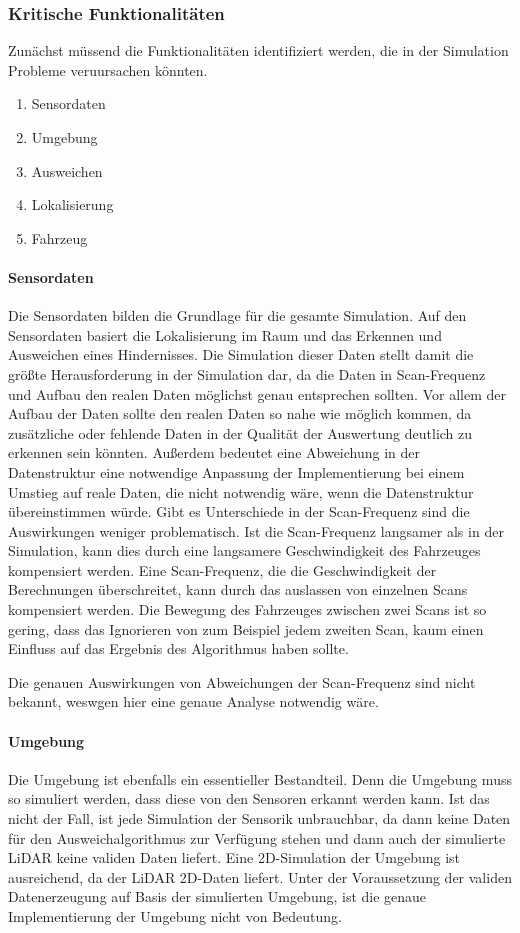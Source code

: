 \subsubsection{Kritische Funktionalitäten}
Zunächst müssend die Funktionalitäten identifiziert werden, die in der Simulation Probleme veruursachen könnten.
\begin{enumerate}
    \item Sensordaten
    \item Umgebung 
    \item Ausweichen
    \item Lokalisierung
    \item Fahrzeug
\end{enumerate}

\paragraph{Sensordaten}
Die Sensordaten bilden die Grundlage für die gesamte Simulation. 
Auf den Sensordaten basiert die Lokalisierung im Raum und das Erkennen und Ausweichen eines Hindernisses. 
Die Simulation dieser Daten stellt damit die größte Herausforderung in der Simulation dar, 
da die Daten in Scan-Frequenz und Aufbau den realen Daten möglichst genau entsprechen sollten.
Vor allem der Aufbau der Daten sollte den realen Daten so nahe wie möglich kommen, 
da zusätzliche oder fehlende Daten in der Qualität der Auswertung deutlich zu erkennen sein könnten. 
Außerdem bedeutet eine Abweichung in der Datenstruktur eine notwendige Anpassung der Implementierung bei einem Umstieg auf reale Daten, 
die nicht notwendig wäre, wenn die Datenstruktur übereinstimmen würde.
Gibt es Unterschiede in der Scan-Frequenz sind die Auswirkungen weniger problematisch. 
Ist die Scan-Frequenz langsamer als in der Simulation, kann dies durch eine langsamere Geschwindigkeit des Fahrzeuges kompensiert werden.
Eine Scan-Frequenz, die die Geschwindigkeit der Berechnungen überschreitet, kann durch das auslassen von einzelnen Scans kompensiert werden.
Die Bewegung des Fahrzeuges zwischen zwei Scans ist so gering, dass das Ignorieren von zum Beispiel jedem zweiten Scan,
kaum einen Einfluss auf das Ergebnis des Algorithmus haben sollte. 

Die genauen Auswirkungen von Abweichungen der Scan-Frequenz sind nicht bekannt, weswgen hier eine genaue Analyse notwendig wäre.

\paragraph{Umgebung}
Die Umgebung ist ebenfalls ein essentieller Bestandteil. 
Denn die Umgebung muss so simuliert werden, dass diese von den Sensoren erkannt werden kann. 
Ist das nicht der Fall, ist jede Simulation der Sensorik unbrauchbar, 
da dann keine Daten für den Ausweichalgorithmus zur Verfügung stehen und dann auch der simulierte LiDAR keine validen Daten liefert.
Eine 2D-Simulation der Umgebung ist ausreichend, da der LiDAR 2D-Daten liefert.
Unter der Voraussetzung der validen Datenerzeugung auf Basis der simulierten Umgebung, 
ist die genaue Implementierung der Umgebung nicht von Bedeutung. 

